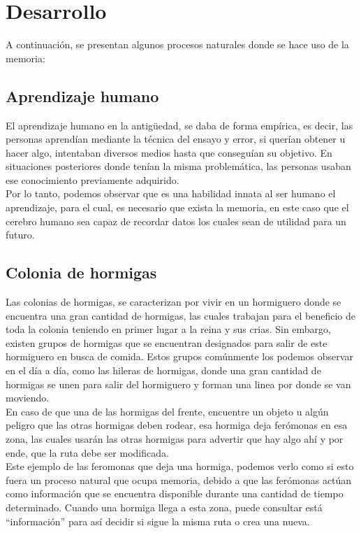 \section{Desarrollo}
	A continuación, se presentan algunos procesos naturales donde se hace uso de la memoria:
\subsection{Aprendizaje humano}
	El aprendizaje humano en la antigüedad, se daba de forma empírica, es decir, las personas aprendían mediante la técnica del ensayo y error, si querían obtener u hacer algo, intentaban diversos medios hasta que conseguían su objetivo. En situaciones posteriores donde tenían la misma problemática, las personas usaban ese conocimiento previamente adquirido.\\ Por lo tanto, podemos observar que es una habilidad innata al ser humano el aprendizaje, para el cual, es necesario que exista la memoria, en este caso que el cerebro humano sea capaz de recordar datos los cuales sean de utilidad para un futuro. 

\subsection{Colonia de hormigas}
	Las colonias de hormigas, se caracterizan por vivir en un hormiguero donde se encuentra una gran cantidad de hormigas, las cuales trabajan para el beneficio de toda la colonia teniendo en primer lugar a la reina y sus crias. Sin embargo, existen grupos de hormigas que se encuentran designados para salir de este hormiguero en busca de comida. Estos grupos comúnmente los podemos observar en el día a día, como las hileras de hormigas, donde una gran cantidad de hormigas se unen para salir del hormiguero y forman una linea por donde se van moviendo.\\
	En caso de que una de las hormigas del frente, encuentre un objeto u algún peligro que las otras hormigas deben rodear, esa hormiga deja ferómonas en esa zona, las cuales usarán las otras hormigas para advertir que hay algo ahí y por ende, que la ruta debe ser modificada.\\ Este ejemplo de las feromonas que deja una hormiga, podemos verlo como si esto fuera un proceso natural que ocupa memoria, debido a que las ferómonas actúan como información que se encuentra disponible durante una cantidad de tiempo determinado. Cuando una hormiga llega a esta zona, puede consultar está ``información'' para así decidir si sigue la misma ruta o crea una nueva.

